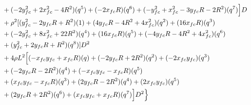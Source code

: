 \documentclass[12pt]{article}
\begin{document}
\begin{align}
    &+  (-2y_{fc}^2 +2x_{fc}^2 - 4R^2)(q^5) +(-2x_{fc}R)(q^6) +(-y_{fc}^2 +x_{fc}^2 - 3y_{fc}R -2R^2)(q^7)  \Bigr]D \nonumber\\
    &+ \rho^2[(y_{fc}^2 -2y_{fc}R+ R^2)(1) + (4y_{fc}R -4R^2+ 4x_{fc}^2)(q^2) + (16x_{fc}R)(q^3)  \nonumber\\
    &+ (-2y_{fc}^2+ 8x_{fc}^2 + 22R^2)(q^4) + (16x_{fc}R)(q^5) +  (-4y_{fc}R-4R^2 + 4x_{fc}^2)(q^6)   \nonumber\\
    &+ (y_{fc}^2+2y_{fc}R +R^2)(q^8)]D^2 \nonumber\\
    &+ 4\rho L^2\Bigl[ (-x_{fc}y_{fc} + x_{fc}R)(q) + (-2y_{fc}R + 2R^2)(q^2) + (-2x_{fc}y_{fc})(q^3)  \nonumber\\
    &+ (-2y_{fc}R  -2R^2)(q^4) + (-x_{fc}y_{fc} -x_{fc}R)(q^5) \nonumber\\
    &+ (x_{fc}y_{fc} - x_{fc}R)(q^3) + (2y_{fc}R - 2R^2)(q^4) + (2x_{fc}y_{fc})(q^5)  \nonumber\\
    &+ (2y_{fc}R  +2R^2)(q^6) + (x_{fc}y_{fc} +x_{fc}R)(q^7) \Bigr]D^2 \Bigr\}
\end{align}
\end{document}
